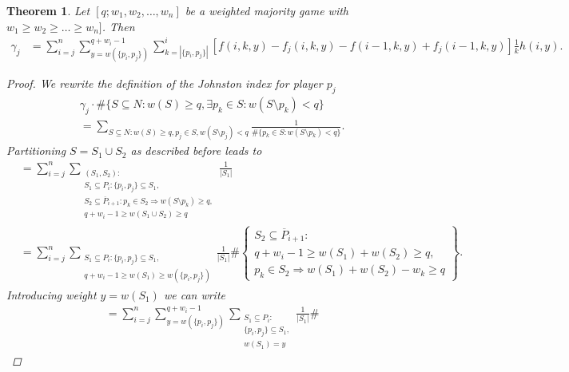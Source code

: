 \documentclass[review]{elsarticle}
\newtheorem{thm}{Theorem} %
\theoremstyle{defn}
\theoremstyle{Pseudo-Code}
\begin{document}
\begin{thm}
\label{thm:Johnston_gamma_j}
Let $[q;w_1,w_2,\dots,w_n]$ be a weighted majority game with $w_1\geq w_2\geq\dots\geq w_n]$. Then
\begin{align*}
  \gamma_j
  &=
  \sum_{i=j}^n
  \sum_{y=w(\{ p_i,p_j \})}^{q+w_i-1}
  \sum_{k=|\{ p_i,p_j \}|}^i
  \scriptstyle
    \left[
      f(i,k,y)-f_j(i,k,y)
      -f(i-1,k,y)+f_j(i-1,k,y)
    \right]
    \frac{1}{k}
    h(i,y)
    .
\end{align*}

\begin{proof}
We rewrite the definition of the Johnston index for player $p_j$ 
\begin{align*}
  &\gamma_j\cdot \#\{ S\subseteq N: w(S)\geq q, \exists p_k\in S: w(S\setminus p_k)<q \}
\\  
  &=
  \sum_{S\subseteq N: w(S)\geq q, p_j\in S, w(S\setminus p_j)<q}
  \frac{1}{\#\{p_k\in S:w(S\setminus p_k)<q \}}
  .
\end{align*}
Partitioning $S=S_1\cup S_2$ as described before leads to
\begin{align*} 
  &=
  \sum_{i=j}^n
  \sum_{\substack{
  (S_1,S_2): 
  \\
  S_1\subseteq P_i: \{p_i, p_j\}\subseteq S_1,
  \\
  S_2\subseteq \overline{P}_{i+1}: p_k\in S_2\Rightarrow w(S\setminus p_{k})\geq q,
\\q+w_i-1\geq
w(S_1\cup S_2)\geq q  
  }}
  \frac{1}{|S_1|}
\\
  &=
  \sum_{i=j}^n
  \sum\limits_{
    \substack{
      S_1\subseteq P_i: \{p_i, p_j\}\subseteq S_1, 
      \\
      q+ w_i-1 \geq w(S_1)\geq w(\{p_i,p_j\})  }}
    \frac{1}{|S_1|}
    \#
    \left\lbrace
    \substack{
         S_2\subseteq \overline{P}_{i+1}: 
         \\
         q+w_i-1\geq w(S_1)+w(S_2)\geq q,
         \\
          p_k\in S_2\Rightarrow w(S_1)+w(S_2)-w_k\geq q    
    }
    \right\rbrace  
    .
\end{align*}
Introducing weight $y=w(S_1)$ we can write
\begin{align*}
  &=
  \sum_{i=j}^n
  \sum_{y=w(\{ p_i,p_j \})}^{q+w_i-1}
  \sum_{
    \substack{
      S_1\subseteq P_i: 
      \\
      \{p_i, p_j\}\subseteq S_1, 
      \\
      w(S_1)=y 
    }
  }
    \frac{1}{|S_1|}
    \#

\end{align*}
\end{proof}
\end{thm}
\end{document}

